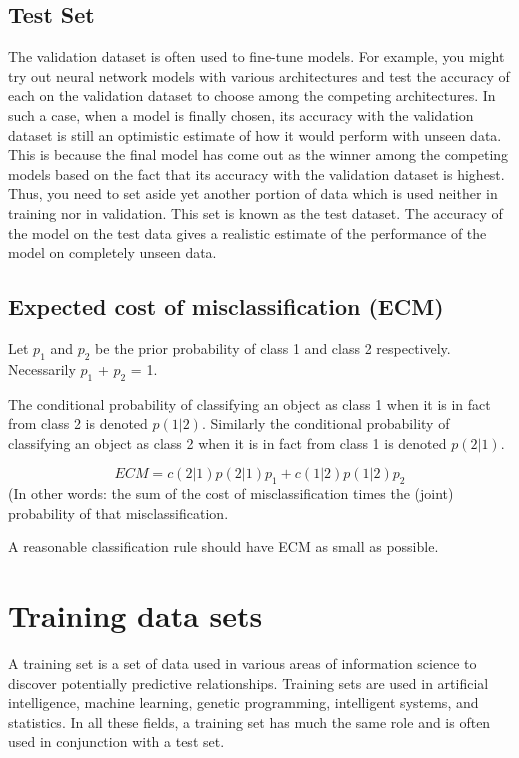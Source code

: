 \documentclass[a4paper,12pt]{article}
\begin{document}
\subsection*{Test Set}
The validation dataset is often used to fine-tune models. For example, you might try out neural network models with various architectures and test the accuracy of each on the validation dataset to choose among the competing architectures. In such a case, when a model is finally chosen, its accuracy with the validation dataset is still an optimistic estimate of how it would perform with unseen data. This is because the final model has come out as the winner among the competing models based on the fact that its accuracy with the validation dataset is highest. Thus, you need to set aside yet another portion of data which is used neither in training nor in validation. This set is known as the test dataset. The accuracy of the model on the test data gives a realistic estimate of the performance of the model on completely unseen data.

\newpage




\subsection{Expected cost of misclassification (ECM)}
Let $p_1$ and $p_2$ be the prior probability of class 1 and class 2 respectively.
Necessarily $p_1$ + $p_2$ = 1.

The conditional probability of classifying an object as class 1 when it is in fact from
class 2 is denoted $p(1|2)$.
Similarly the conditional probability of classifying an object as class 2 when it is in
fact from class 1 is denoted $p(2|1)$.

\[ECM = c(2|1)p(2|1)p_1 + c(1|2)p(1|2)p_2\]
(In other words: the sum of the cost of misclassification times the (joint) probability of that misclassification.

A reasonable classification rule should have ECM as small as possible.






\section{Training data sets}

A training set is a set of data used in various areas of information science to discover potentially predictive relationships. Training sets are used in artificial intelligence, machine learning, genetic programming, intelligent systems, and statistics. In all these fields, a training set has much the same role and is often used in conjunction with a test set.
\end{document}
